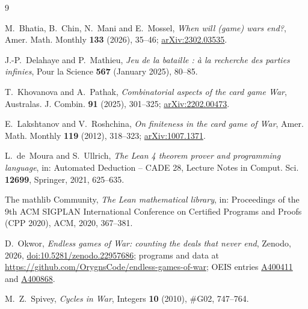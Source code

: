 \documentclass[11pt,a4paper]{amsart}
\theoremstyle{definition}
\theoremstyle{remark}
\newcommand{\oeis}[1]{\href{https://oeis.org/#1}{#1}}
\begin{document}
\begin{thebibliography}{9}

M.~Bhatia, B.~Chin, N.~Mani and E.~Mossel,
\emph{When will (game) wars end?}, Amer. Math. Monthly \textbf{133} (2026), 35--46;
\href{https://arxiv.org/abs/2302.03535}{arXiv:2302.03535}.

J.-P.~Delahaye and P.~Mathieu,
\emph{Jeu de la bataille : à la recherche des parties infinies},
Pour la Science \textbf{567} (January 2025), 80--85.

T.~Khovanova and A.~Pathak,
\emph{Combinatorial aspects of the card game War},
Australas. J. Combin. \textbf{91} (2025), 301--325;
\href{https://arxiv.org/abs/2202.00473}{arXiv:2202.00473}.

E.~Lakshtanov and V.~Roshchina,
\emph{On finiteness in the card game of War},
Amer. Math. Monthly \textbf{119} (2012), 318--323;
\href{https://arxiv.org/abs/1007.1371}{arXiv:1007.1371}.

L.~de~Moura and S.~Ullrich,
\emph{The Lean 4 theorem prover and programming language},
in: Automated Deduction -- CADE 28, Lecture Notes in Comput. Sci. \textbf{12699}, Springer, 2021, 625--635.

The mathlib Community,
\emph{The Lean mathematical library},
in: Proceedings of the 9th ACM SIGPLAN International Conference on Certified Programs and Proofs (CPP 2020), ACM, 2020, 367--381.

D.~Okwor,
\emph{Endless games of War: counting the deals that never end}, Zenodo, 2026,
\href{https://doi.org/10.5281/zenodo.22957686}{doi:10.5281/zenodo.22957686};
programs and data at \url{https://github.com/OrygnsCode/endless-games-of-war};
OEIS entries \oeis{A400411} and \oeis{A400868}.

M.~Z.~Spivey,
\emph{Cycles in War},
Integers \textbf{10} (2010), \#G02, 747--764.

\end{thebibliography}
\end{document}
